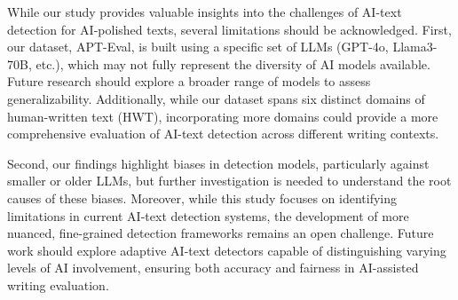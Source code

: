 While our study provides valuable insights into the challenges of AI-text detection for AI-polished texts, several limitations should be acknowledged. First, our dataset, APT-Eval, is built using a specific set of LLMs (GPT-4o, Llama3-70B, etc.), which may not fully represent the diversity of AI models available. Future research should explore a broader range of models to assess generalizability. Additionally, while our dataset spans six distinct domains of human-written text (HWT), incorporating more domains could provide a more comprehensive evaluation of AI-text detection across different writing contexts.

Second, our findings highlight biases in detection models, particularly against smaller or older LLMs, but further investigation is needed to understand the root causes of these biases. Moreover, while this study focuses on identifying limitations in current AI-text detection systems, the development of more nuanced, fine-grained detection frameworks remains an open challenge. Future work should explore adaptive AI-text detectors capable of distinguishing varying levels of AI involvement, ensuring both accuracy and fairness in AI-assisted writing evaluation.